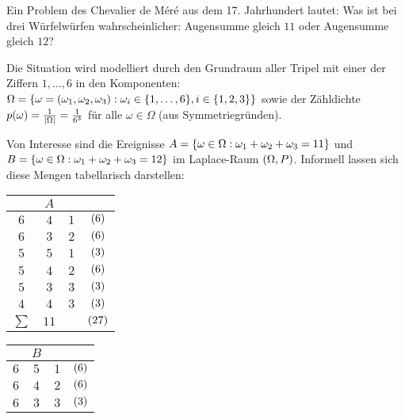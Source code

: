 \documentclass{lecture}
\begin{document}
    \begin{example}
        Ein Problem des Chevalier de Méré aus dem 17. Jahrhundert lautet: Was ist bei drei Würfelwürfen wahrscheinlicher: Augensumme gleich \(11\) oder Augensumme gleich \(12\)?

        Die Situation wird modelliert durch den Grundraum aller Tripel mit einer der Ziffern \(1, \ldots, 6\) in den Komponenten: \(\Omega = \braces*{\omega = \parentheses*{\omega_1, \omega_2, \omega_3} : \omega_i \in \braces*{1, \ldots, 6}, i \in \braces*{1, 2, 3}}\) sowie der Zähldichte \(p\parentheses*{\omega} = \frac{1}{\absolute*{\Omega}} = \frac{1}{6^3}\) für alle \(\omega \in \Omega\) (aus Symmetriegründen).

        Von Interesse sind die Ereignisse \(A = \braces*{\omega \in \Omega : \omega_1 + \omega_2 + \omega_3 = 11}\) und \(B = \braces*{\omega \in \Omega : \omega_1 + \omega_2 + \omega_3 = 12}\) im Laplace-Raum \(\parentheses*{\Omega, P}\).
        Informell lassen sich diese Mengen tabellarisch darstellen:
        \begin{center}
            \begin{tabular}{cccc}
                \toprule
                & \(A\) & & \\
                \midrule
                \(6\) & \(4\) & \(1\) & \(\parentheses*{6}\)\\
                \(6\) & \(3\) & \(2\) & \(\parentheses*{6}\)\\
                \(5\) & \(5\) & \(1\) & \(\parentheses*{3}\)\\
                \(5\) & \(4\) & \(2\) & \(\parentheses*{6}\)\\
                \(5\) & \(3\) & \(3\) & \(\parentheses*{3}\)\\
                \(4\) & \(4\) & \(3\) & \(\parentheses*{3}\)\\
                \midrule
                \(\sum\) & \(11\) & & \(\parentheses*{27}\)\\
                \bottomrule
            \end{tabular}
            \quad
            \begin{tabular}{cccc}
                \toprule
                & \(B\) & & \\
                \midrule
                \(6\) & \(5\) & \(1\) & \(\parentheses*{6}\)\\
                \(6\) & \(4\) & \(2\) & \(\parentheses*{6}\)\\
                \(6\) & \(3\) & \(3\) & \(\parentheses*{3}\)\\

\end{tabular}
\end{center}
\end{example}
\end{document}
